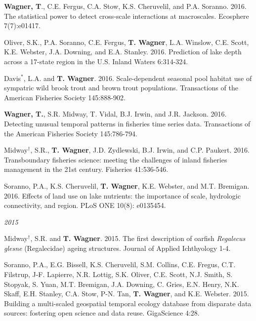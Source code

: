 \documentclass[10pt]{article}
\begin{document}
\begin{flushleft}
\begin{etaremune}[start=55]
\item {\bf Wagner, T}., C.E. Fergus, C.A. Stow, K.S. Cheruvelil, and P.A. Soranno. 2016. The statistical power to detect cross-scale interactions at macroscales. Ecosphere 7(7):e01417.

\item Oliver, S.K., P.A. Soranno, C.E. Fergus, {\bf T. Wagner}, L.A. Winslow, C.E. Scott, K.E. Webster, J.A. Downing, and E.A. Stanley. 2016. Prediction of lake depth across a 17-state region in the U.S. Inland Waters 6:314-324.

\item Davis$^*$, L.A. and {\bf T. Wagner}. 2016. Scale-dependent seasonal pool habitat use of sympatric wild brook trout and brown trout populations. Transactions of the American Fisheries Society 145:888-902.

\item {\bf Wagner, T.}, S.R. Midway, T. Vidal, B.J. Irwin, and J.R. Jackson. 2016. Detecting unusual temporal patterns in fisheries time series data. Transactions of the American Fisheries Society 145:786-794.

\item Midway$^\dagger$, S.R., {\bf T. Wagner}, J.D. Zydlewski, B.J. Irwin, and C.P. Paukert. 2016. Transboundary fisheries science: meeting the challenges of inland fisheries management in the 21st century. Fisheries 41:536-546.

\item Soranno, P.A., K.S. Cheruvelil, {\bf T. Wagner}, K.E. Webster, and M.T. Bremigan. 2016. Effects of land use on lake nutrients: the importance of scale, hydrologic connectivity, and region. PLoS ONE  10(8): e0135454.

\end{etaremune}
\emph{2015}
\begin{etaremune}[start=48]
\item Midway$^\dagger$, S.R. and {\bf T. Wagner}. 2015. The first description of oarfish \emph{Regalecus glesne} (Regalecidae) ageing structures. Journal of Applied Ichthyology 1-4.

\item Soranno, P.A., E.G. Bissell, K.S. Cheruvelil, S.M. Collins, C.E. Fregus, C.T. Filstrup, J-F. Lapierre, N.R. Lottig, S.K. Oliver, C.E. Scott, N.J. Smith, S. Stopyak, S. Yuan, M.T. Bremigan, J.A. Downing, C. Gries, E.N. Henry, N.K. Skaff, E.H. Stanley, C.A. Stow, P-N. Tan, {\bf T. Wagner}, and K.E. Webster. 2015. Building a multi-scaled geospatial temporal ecology database from disparate data sources: fostering open science and data reuse. GigaScience 4:28.


\end{etaremune}
\end{flushleft}
\end{document}

